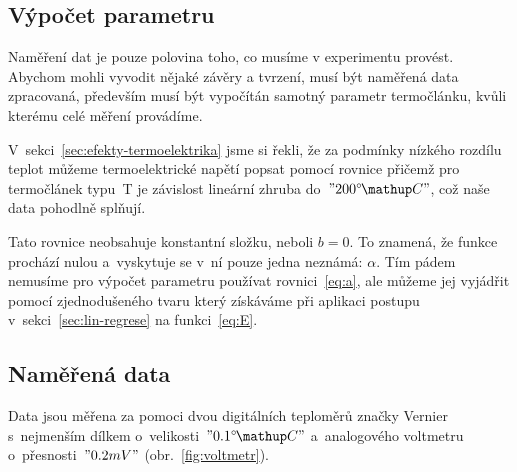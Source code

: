 \subsection{Výpočet parametru}
Naměření dat je pouze polovina toho, co musíme v experimentu provést. Abychom
mohli vyvodit nějaké závěry a tvrzení, musí být naměřená data zpracovaná,
především musí být vypočítán samotný parametr termočlánku, kvůli kterému
celé měření provádíme.

V~sekci~\ref{sec:efekty-termoelektrika} jsme si řekli, že za podmínky nízkého
rozdílu teplot můžeme termoelektrické napětí popsat pomocí rovnice
přičemž pro termočlánek typu~T je závislost lineární zhruba do~$"200 \C"$, což
naše data pohodlně splňují.~\cite{thermocoupleinfo}

Tato rovnice neobsahuje konstantní složku, neboli $b=0$. To znamená, že funkce
prochází nulou a~vyskytuje se v~ní pouze jedna neznámá: $\alpha$. Tím pádem
nemusíme pro výpočet parametru používat rovnici~\eqref{eq:a}, ale můžeme jej
vyjádřit pomocí zjednodušeného tvaru
který získáváme při aplikaci postupu v~sekci~\ref{sec:lin-regrese} na 
funkci~\eqref{eq:E}. 


\subsection{Naměřená data}
Data jsou měřena za pomoci dvou digitálních teploměrů značky Vernier
s~nejmenším dílkem o~velikosti~$"0.1 \C"$ a~analogového voltmetru
o~přesnosti~$"0.2 mV"$ (obr.~\ref{fig:voltmetr}).

